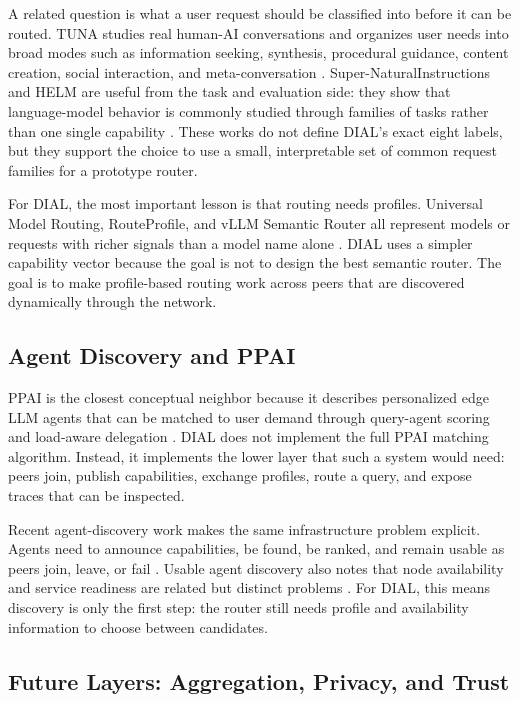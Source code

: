 A related question is what a user request should be classified into before it
can be routed. TUNA studies real human-AI conversations and organizes user
needs into broad modes such as information seeking, synthesis, procedural
guidance, content creation, social interaction, and meta-conversation
\citep{shelby2025tuna}. Super-NaturalInstructions and HELM are useful from the
task and evaluation side: they show that language-model behavior is commonly
studied through families of tasks rather than one single capability
\citep{wang2022supernaturalinstructions,liang2022helm}. These works do not
define DIAL's exact eight labels, but they support the choice to use a small,
interpretable set of common request families for a prototype router.

For DIAL, the most important lesson is that routing needs profiles. Universal
Model Routing, RouteProfile, and vLLM Semantic Router all represent models or
requests with richer signals than a model name alone
\citep{jitkrittum2025uniroute,xu2026routeprofile,vllmsemanticrouter2026}. DIAL
uses a simpler capability vector because the goal is not to design the best
semantic router. The goal is to make profile-based routing work across peers
that are discovered dynamically through the network.

\subsection{Agent Discovery and PPAI}

PPAI is the closest conceptual neighbor because it describes personalized edge
LLM agents that can be matched to user demand through query-agent scoring and
load-aware delegation \citep{wang2026ppai}. DIAL does not implement the full
PPAI matching algorithm. Instead, it implements the lower layer that such a
system would need: peers join, publish capabilities, exchange profiles, route a
query, and expose traces that can be inspected.

Recent agent-discovery work makes the same infrastructure problem explicit.
Agents need to announce capabilities, be found, be ranked, and remain usable
as peers join, leave, or fail \citep{guo2026agentdiscovery}. Usable agent
discovery also notes that node availability and service readiness are related
but distinct problems
\citep{dazzi2026usableagentdiscovery}. For DIAL, this means discovery is only
the first step: the router still needs profile and availability information to
choose between candidates.

\subsection{Future Layers: Aggregation, Privacy, and Trust}

